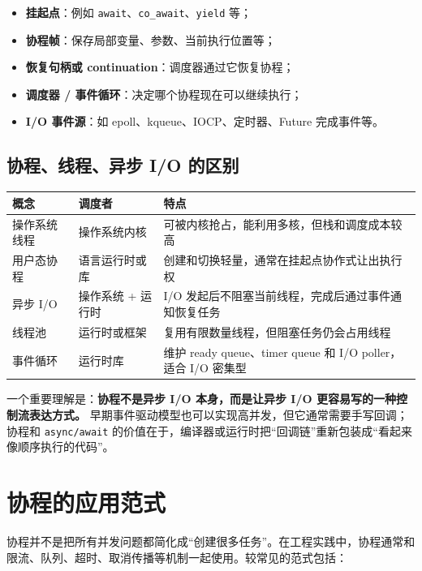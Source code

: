 \documentclass[UTF8,zihao=-4]{ctexart}
\begin{document}
\begin{itemize}
  \item \textbf{挂起点}：例如 \texttt{await}、\texttt{co\_await}、\texttt{yield} 等；
  \item \textbf{协程帧}：保存局部变量、参数、当前执行位置等；
  \item \textbf{恢复句柄或 continuation}：调度器通过它恢复协程；
  \item \textbf{调度器 / 事件循环}：决定哪个协程现在可以继续执行；
  \item \textbf{I/O 事件源}：如 epoll、kqueue、IOCP、定时器、Future 完成事件等。
\end{itemize}

\subsection{协程、线程、异步 I/O 的区别}

\begin{center}
\begin{tabular}{p{3.2cm}p{4.2cm}p{6.5cm}}
\toprule
概念 & 调度者 & 特点 \\
\midrule
操作系统线程 & 操作系统内核 & 可被内核抢占，能利用多核，但栈和调度成本较高 \\
用户态协程 & 语言运行时或库 & 创建和切换轻量，通常在挂起点协作式让出执行权 \\
异步 I/O & 操作系统 + 运行时 & I/O 发起后不阻塞当前线程，完成后通过事件通知恢复任务 \\
线程池 & 运行时或框架 & 复用有限数量线程，但阻塞任务仍会占用线程 \\
事件循环 & 运行时库 & 维护 ready queue、timer queue 和 I/O poller，适合 I/O 密集型 \\
\bottomrule
\end{tabular}
\end{center}

一个重要理解是：\textbf{协程不是异步 I/O 本身，而是让异步 I/O 更容易写的一种控制流表达方式。} 早期事件驱动模型也可以实现高并发，但它通常需要手写回调；协程和 \texttt{async/await} 的价值在于，编译器或运行时把“回调链”重新包装成“看起来像顺序执行的代码”。

\section{协程的应用范式}

协程并不是把所有并发问题都简化成“创建很多任务”。在工程实践中，协程通常和限流、队列、超时、取消传播等机制一起使用。较常见的范式包括：
\end{document}
